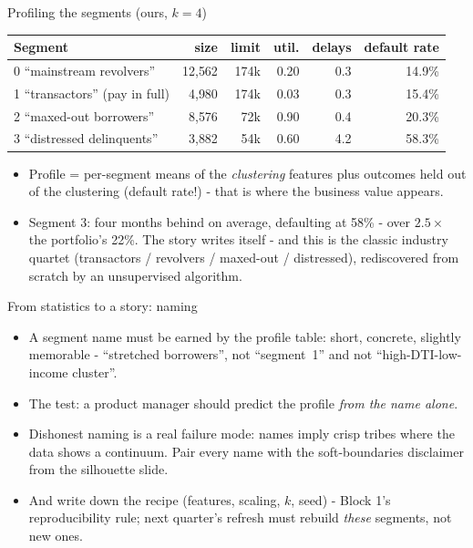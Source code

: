 \documentclass[10pt,aspectratio=169]{beamer}
\begin{document}
\begin{frame}{Profiling the segments (ours, $k=4$)}
  \small
  \begin{center}
  \begin{tabular}{@{}lrrrrr@{}}
    \toprule
    Segment & size & limit & util. & delays & \alert{default rate} \\
    \midrule
    0 ``mainstream revolvers'' & 12{,}562 & 174k & 0.20 & 0.3 & 14.9\% \\
    1 ``transactors'' (pay in full) & 4{,}980 & 174k & 0.03 & 0.3 & 15.4\% \\
    2 ``maxed-out borrowers'' & 8{,}576 & 72k & \alert{0.90} & 0.4 & 20.3\% \\
    3 ``\alert{distressed delinquents}'' & 3{,}882 & 54k & 0.60 & \alert{4.2} & \alert{58.3\%} \\
    \bottomrule
  \end{tabular}
  \end{center}
  \vspace{0.4em}
  \begin{itemize}\small
    \item Profile = per-segment means of the \emph{clustering} features
          \alert{plus} outcomes held out of the clustering
          (default rate!) - that is where the business value appears.
    \item Segment 3: four months behind on average, defaulting at
          \alert{58\%} - over $2.5\times$ the portfolio's 22\%. The story
          writes itself - and this is the classic industry quartet
          (transactors / revolvers / maxed-out / distressed), rediscovered
          from scratch by an unsupervised algorithm.
  \end{itemize}
\end{frame}

\begin{frame}{From statistics to a story: naming}
  \begin{itemize}
    \item A segment name must be earned by the profile table: short,
          concrete, slightly memorable - ``stretched borrowers'', not
          ``segment~1'' and not ``high-DTI-low-income cluster''.
    \item The test: a product manager should predict the profile
          \emph{from the name alone}.
    \item Dishonest naming is a real failure mode: names imply crisp tribes
          where the data shows a continuum. Pair every name with the
          \alert{soft-boundaries disclaimer} from the silhouette slide.
    \item And write down the recipe (features, scaling, $k$, seed) -
          Block 1's reproducibility rule; next quarter's refresh must
          rebuild \emph{these} segments, not new ones.
  \end{itemize}
\end{frame}
\end{document}
